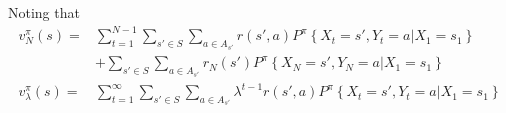 Noting that
\begin{equation}
    \begin{aligned}
        v^\pi_N(s) =& \sum^{N-1}_{t=1} \sum^{}_{s' \in S} \sum^{}_{a \in A_{s'}} 
        r(s', a) P^\pi \left\{ X_t = s', Y_t = a | X_1 = s_1 \right\} \\
                    &+ \sum^{}_{s' \in S} \sum^{}_{a \in A_{s'}} r_N(s') P^\pi \left\{ X_N = s', Y_N = a | X_1 = s_1 \right\} \\
        v^\pi_\lambda(s) =& \sum^{\infty}_{t=1} \sum^{}_{s' \in S} \sum^{}_{a \in A_{s'}} 
        \lambda^{t-1} r(s', a) P^\pi \left\{ X_t = s', Y_t = a | X_1 = s_1 \right\}
    \end{aligned}
\end{equation}

